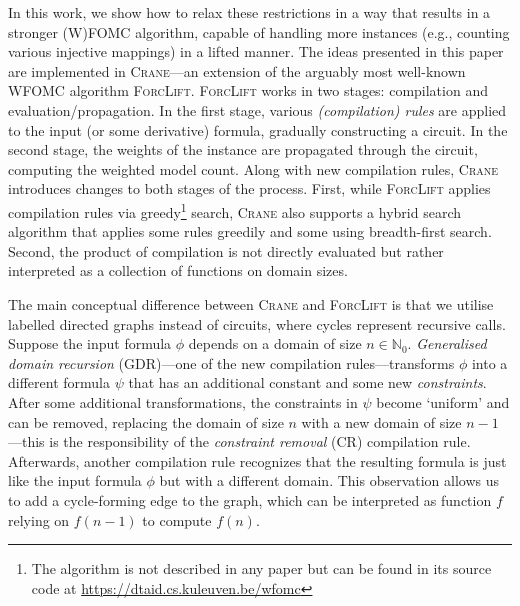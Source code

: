 \documentclass{article}
\theoremstyle{definition}
\begin{document}
In this work, we show how to relax these restrictions in a way that results in a
stronger (W)FOMC algorithm, capable of handling more instances (e.g., counting
various injective mappings) in a lifted manner. The ideas presented in this
paper are implemented in \textsc{Crane}---an extension of the arguably most
well-known WFOMC algorithm \textsc{ForcLift}. \textsc{ForcLift} works in two
stages: compilation and evaluation/propagation. In the first stage, various
\emph{(compilation) rules} are applied to the input (or some derivative)
formula, gradually constructing a circuit. In the second stage, the weights of
the instance are propagated through the circuit, computing the weighted model
count. Along with new compilation rules, \textsc{Crane} introduces changes to
both stages of the process. First, while \textsc{ForcLift} applies compilation
rules via greedy\footnote{The algorithm is not described in any paper but can be
  found in its source code at \url{https://dtaid.cs.kuleuven.be/wfomc}}
search, \textsc{Crane} also supports a hybrid search algorithm that applies some
rules greedily and some using breadth-first search. Second, the product of
compilation is not directly evaluated but rather interpreted as a collection of
functions on domain sizes.



The main conceptual difference between \textsc{Crane} and \textsc{ForcLift} is
that we utilise labelled directed graphs instead of circuits, where cycles
represent recursive calls. Suppose the input formula $\phi$ depends on a domain
of size $n \in \mathbb{N}_{0}$. \emph{Generalised domain recursion} (GDR)---one
of the new compilation rules---transforms $\phi$ into a different formula $\psi$
that has an additional constant and some new \emph{constraints}. After some
additional transformations, the constraints in $\psi$ become `uniform' and can
be removed, replacing the domain of size $n$ with a new domain of size
$n-1$---this is the responsibility of the \emph{constraint removal} (CR)
compilation rule. Afterwards, another compilation rule recognizes that the
resulting formula is just like the input formula $\phi$ but with a different
domain. This observation allows us to add a cycle-forming edge to the graph,
which can be interpreted as function $f$ relying on $f(n-1)$ to compute $f(n)$.
\end{document}
